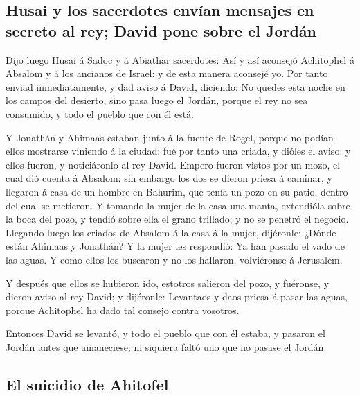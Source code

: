 \hypertarget{husai-y-los-sacerdotes-envuxedan-mensajes-en-secreto-al-rey-david-pone-sobre-el-jorduxe1n}{%
\subsection{Husai y los sacerdotes envían mensajes en secreto al rey;
David pone sobre el
Jordán}\label{husai-y-los-sacerdotes-envuxedan-mensajes-en-secreto-al-rey-david-pone-sobre-el-jorduxe1n}}

 Dijo luego Husai á Sadoc y á Abiathar sacerdotes: Así y
así aconsejó Achitophel á Absalom y á los ancianos de Israel: y de esta
manera aconsejé yo.  Por tanto enviad inmediatamente, y dad
aviso á David, diciendo: No quedes esta noche en los campos del
desierto, sino pasa luego el Jordán, porque el rey no sea consumido, y
todo el pueblo que con él está.

 Y Jonathán y Ahimaas estaban junto á la fuente de Rogel,
porque no podían ellos mostrarse viniendo á la ciudad; fué por tanto una
criada, y dióles el aviso: y ellos fueron, y noticiáronlo al rey David.
 Empero fueron vistos por un mozo, el cual dió cuenta á
Absalom: sin embargo los dos se dieron priesa á caminar, y llegaron á
casa de un hombre en Bahurim, que tenía un pozo en su patio, dentro del
cual se metieron.  Y tomando la mujer de la casa una manta,
extendióla sobre la boca del pozo, y tendió sobre ella el grano
trillado; y no se penetró el negocio.  Llegando luego los
criados de Absalom á la casa á la mujer, dijéronle: ¿Dónde están Ahimaas
y Jonathán? Y la mujer les respondió: Ya han pasado el vado de las
aguas. Y como ellos los buscaron y no los hallaron, volviéronse á
Jerusalem.

 Y después que ellos se hubieron ido, estotros salieron del
pozo, y fuéronse, y dieron aviso al rey David; y dijéronle: Levantaos y
daos priesa á pasar las aguas, porque Achitophel ha dado tal consejo
contra vosotros.

 Entonces David se levantó, y todo el pueblo que con él
estaba, y pasaron el Jordán antes que amaneciese; ni siquiera faltó uno
que no pasase el Jordán.

\hypertarget{el-suicidio-de-ahitofel}{%
\subsection{El suicidio de Ahitofel}\label{el-suicidio-de-ahitofel}}

